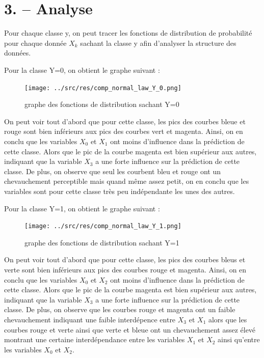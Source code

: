 \documentclass[
]{article}
\begin{document}
\newpage{}

\section{3. -- Analyse}\label{analyse}

Pour chaque classe y, on peut tracer les fonctions de distribution de
probabilité pour chaque donnée \(X_k\) sachant la classe y afin
d'analyser la structure des données.

Pour la classe Y=0, on obtient le graphe suivant :

\begin{figure}
\centering
\texttt{[image: ../src/res/comp\_normal\_law\_Y\_0.png]}
\caption{graphe des fonctions de distribution sachant Y=0}
\end{figure}

On peut voir tout d'abord que pour cette classe, les pics des courbes
bleue et rouge sont bien inférieurs aux pics des courbes vert et
magenta. Ainsi, on en conclu que les variables \(X_0\) et \(X_1\) ont
moins d'influence dans la prédiction de cette classe. Alors que le pic
de la courbe magenta est bien supérieur aux autres, indiquant que la
variable \(X_3\) a une forte influence sur la prédiction de cette
classe. De plus, on observe que seul les courbent bleu et rouge ont un
chevauchement perceptible mais quand même assez petit, on en conclu que
les variables sont pour cette classe très peu indépendante les unes des
autres.

\newpage{}

Pour la classe Y=1, on obtient le graphe suivant :

\begin{figure}
\centering
\texttt{[image: ../src/res/comp\_normal\_law\_Y\_1.png]}
\caption{graphe des fonctions de distribution sachant Y=1}
\end{figure}

On peut voir tout d'abord que pour cette classe, les pics des courbes
bleus et verte sont bien inférieurs aux pics des courbes rouge et
magenta. Ainsi, on en conclu que les variables \(X_0\) et \(X_2\) ont
moins d'influence dans la prédiction de cette classe. Alors que le pic
de la courbe magenta est bien supérieur aux autres, indiquant que la
variable \(X_3\) a une forte influence sur la prédiction de cette
classe. De plus, on observe que les courbes rouge et magenta ont un
faible chevauchement indiquant une faible interdépence entre \(X_3\) et
\(X_1\) alors que les courbes rouge et verte ainsi que verte et bleue
ont un chevauchement assez élevé montrant une certaine interdépendance
entre les variables \(X_1\) et \(X_2\) ainsi qu'entre les variables
\(X_0\) et \(X_2\).
\end{document}
